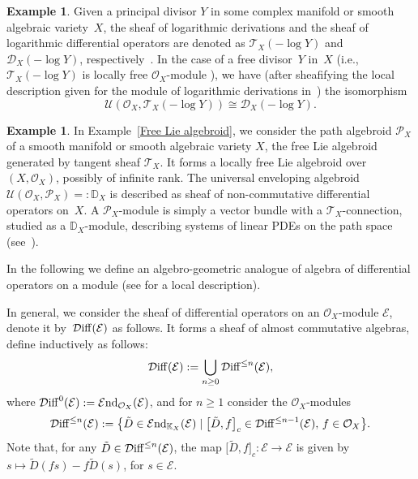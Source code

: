 \documentclass[pdftex]{sigma}
\numberwithin{equation}{section}
\theoremstyle{definition}
\newtheorem{Exm}[Thm]{Example}
\begin{document}
\begin{Exm} \label{sheaf of log diff operators} Given a principal divisor $Y$ in some complex manifold or smooth algebraic variety~$X$, the sheaf of logarithmic derivations and the sheaf of logarithmic differential operators are denoted as $\mathcal{T}_X(-\log Y)$ and $\mathcal{D}_X(-\log Y)$, respectively~\cite{AA}. In the case of a free divisor~$Y$ in~$X$ (i.e., $\mathcal{T}_X(-\log Y)$ is locally free $\mathcal{O}_X$-module \cite{CMD,AA,BP}), we have (after sheafifying the local description given for the module of logarithmic derivations in~\cite{LM}) the isomorphism
\[
\mathcal{U}(\mathcal{O}_X, \mathcal{T}_X(-\log Y)) \cong \mathcal{D}_X(-\log Y).
\]
\end{Exm}
\begin{Exm}
In Example~\ref{Free Lie algebroid}, we consider the path algebroid $\mathcal{P}_X$ of a smooth manifold or smooth algebraic variety $X$, the free Lie algebroid generated by tangent sheaf $\mathcal{T}_X$. It forms a locally free Lie algebroid over $(X,\mathcal{O}_X)$, possibly of infinite rank. The universal enveloping algebroid $\mathcal{U}(\mathcal{O}_X,\mathcal{P}_X) =:\mathbb{D}_X$ is described as sheaf of non-commutative differential operators on~$X$. A $\mathcal{P}_X$-module is simply a vector bundle with a $\mathcal{T}_X$-connection, studied as a $\mathbb{D}_X$-module, describing systems of linear PDEs on the path space (see~\cite{MK}).
\end{Exm}

In the following we define an algebro-geometric analogue of algebra of differential operators on a module (see \cite{HOM, LM,TS} for a local description).

In general, we consider the sheaf of differential operators on an $\mathcal{O}_X$-module $\mathcal{E}$, denote it by~$\mathcal{D}{\rm iff}(\mathcal{E})$ as follows. It forms a sheaf of almost commutative algebras, define inductively as follows:
\[
\mathcal{D}{\rm iff}(\mathcal{E}):= \bigcup_{n \geq 0} \mathcal{D}{\rm iff}^{\leq n}(\mathcal{E}),
\]
where
$\mathcal{D}{\rm iff}^{0}(\mathcal{E}):= \mathcal{E}{\rm nd}_{\mathcal{O}_X}(\mathcal{E})$,
and for $n \geq 1$ consider the $\mathcal{O}_X$-modules
\[
\mathcal{D}{\rm iff}^{\leq n}(\mathcal{E}):= \bigl\{\tilde{D} \in \mathcal{E}{\rm nd}_{\mathbb{K}_X}(\mathcal{E}) \mid \bigl[\tilde{D}, f\bigr]_c \in \mathcal{D}{\rm iff}^{\leq n-1}(\mathcal{E}),\, f \in \mathcal{O}_X\bigr\}.
\]
Note that, for any $\tilde{D} \in \mathcal{D}{\rm iff}^{\leq n}(\mathcal{E})$,
the map $\bigl[\tilde{D}, f\bigr]_c\colon \mathcal{E} \rightarrow \mathcal{E}$ is given by $s \mapsto \tilde{D}(f s) - f \tilde{D}(s)$, for $s \in \mathcal{E}$.
\end{document}
